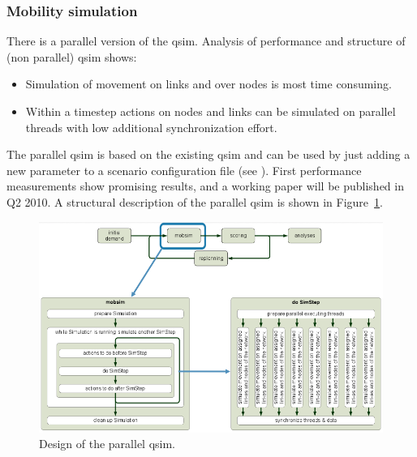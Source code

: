 \subsubsection{Mobility simulation}\label{sec:ParallelQsim}

There is a parallel version of the qsim. Analysis of performance and structure of (non parallel) qsim shows:
\begin{itemize}
\item Simulation of movement on links and over nodes is most time consuming.
\item Within a timestep actions on nodes and links can be simulated on parallel threads with low additional synchronization effort.
\end{itemize}

The parallel qsim is based on the existing qsim and can be used by just adding a new parameter to a scenario configuration file (see ). First performance measurements show promising results, and a working paper will be published in Q2 2010. A structural description of the parallel qsim is shown in Figure~\ref{fig:ParallelQsim}.
\begin{figure}[htp]
\includegraphics[width=\textwidth]{figures/qsimParallel/parallelqsim.png}
\caption{Design of the parallel qsim.}\label{fig:ParallelQsim}
\end{figure}

